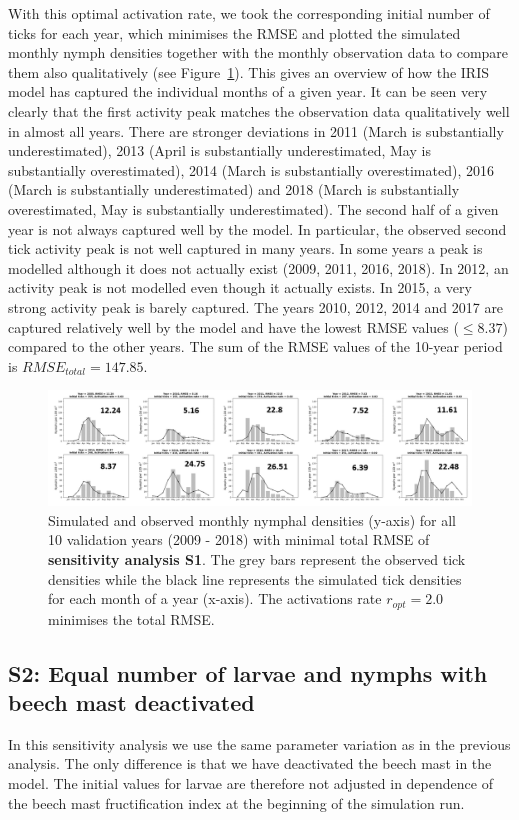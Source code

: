 \documentclass[a4paper, 11pt]{scrartcl}
\begin{document}
With this optimal activation rate, we took the corresponding initial number of ticks for each year, which minimises the RMSE and plotted the simulated monthly nymph densities
together with the monthly observation data to compare them also qualitatively (see Figure~\ref{fig:initial_ticks_with_beech}). This gives an overview of how the IRIS model
has captured the individual months of a given year. It can be seen very clearly that the first activity peak matches the observation data qualitatively well in almost all years.
There are stronger deviations in 2011 (March is substantially underestimated), 2013 (April is substantially underestimated, May is substantially overestimated), 2014 (March is
substantially overestimated), 2016 (March is substantially underestimated) and 2018 (March is substantially overestimated, May is substantially underestimated). The second half
of a given year is not always captured well by the model. In particular, the observed second tick activity peak is not well captured in many years. In some years a peak is
modelled although it does not actually exist (2009, 2011, 2016, 2018). In 2012, an activity peak is not modelled even though it actually exists. In 2015, a very strong activity
peak is barely captured. The years 2010, 2012, 2014 and 2017 are captured relatively well by the model and have the lowest RMSE values ($\leq 8.37$) compared to the other years.
The sum of the RMSE values of the 10-year period is $RMSE_{total} = 147.85$.

\begin{figure}[h!]
\centering
\includegraphics[width=\linewidth]{figures/initial_ticks_with_beech}
\caption{Simulated and observed monthly nymphal densities (y-axis) for all 10 validation years (2009 - 2018) with minimal total RMSE of \textbf{sensitivity analysis S1}. The grey
bars represent the observed tick densities while the black line represents the simulated tick densities for each month of a year (x-axis). The activations rate $r_{opt} = 2.0$
minimises the total RMSE.}
\label{fig:initial_ticks_with_beech}
\end{figure}


\subsection{S2: Equal number of larvae and nymphs with beech mast deactivated}
In this sensitivity analysis we use the same parameter variation as in the previous analysis. The only difference is that we have deactivated the beech mast in the model. The
initial values for larvae are therefore not adjusted in dependence of the beech mast fructification index at the beginning of the simulation run.
\end{document}
